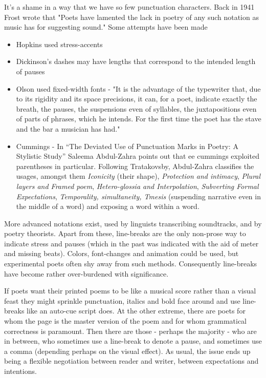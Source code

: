 \documentclass[11pt]{article}
\begin{document}
It's a shame in a way that we have so few punctuation characters. Back in 1941 Frost wrote that "Poets have lamented the lack in poetry of any such notation as music has for suggesting sound." Some attempts have been made
\begin{itemize}
\item Hopkins used stress-accents
\item Dickinson's dashes may have lengths that correspond to the intended length of pauses

\item Olson used fixed-width fonts - "It is the advantage of the typewriter that, due to its rigidity and its space precisions, it can, for a poet, indicate exactly the breath, the pauses, the suspensions even of syllables, the juxtapositions even of parts of phrases, which he intends. For the first time the poet has the stave and the bar a musician has had."

\item Cummings - In ``The Deviated Use of Punctuation
Marks in Poetry: A Stylistic Study'' Saleema Abdul-Zahra points out that ee cummings exploited parentheses in particular. Following Tratakovsby, Abdul-Zahra classifies the usages, amongst them \textit{Iconicity} (their shape), \textit{Protection and intimacy}, \textit{Plural layers and Framed poem}, \textit{Hetero-glossia and Interpolation}, \textit{Subverting Formal Expectations}, \textit{Temporality, simultaneity, Tmesis} (suspending narrative even in the middle of a word) and exposing a word within a word.

\end{itemize}

More advanced notations exist, used by linguists transcribing soundtracks, and by poetry theorists.
Apart from these, line-breaks are the only non-prose way to indicate stress and pauses (which in the past was indicated with the aid of meter and missing beats). Colors, font-changes and animation could be used, but experimental poets often shy away from such methods. Consequently line-breaks have become rather over-burdened with significance.



If poets want their printed poems to be like a musical score rather than a visual feast they might sprinkle punctuation, italics and bold face  around and use line-breaks like an auto-cue script does. At the other extreme, there are poets for whom the page is the master version of the poem and for whom grammatical correctness is paramount. Then there are those - perhaps the majority - who are in between, who sometimes use a line-break to denote a pause, and sometimes use a comma
(depending perhaps on the visual effect). As usual, the issue ends up being a flexible negotiation between reader and writer, between expectations and intentions.
\end{document}
